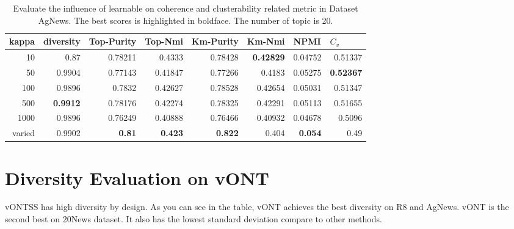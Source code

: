 \documentclass[11pt]{article}
\begin{document}
\begin{table}
\centering
\begin{tabular}{|r|r|r|r|r|r|r|r|}
\multicolumn{1}{l}{kappa} & \multicolumn{1}{l}{diversity} & \multicolumn{1}{l}{Top-Purity} & \multicolumn{1}{l}{Top-Nmi} & \multicolumn{1}{l}{Km-Purity} & \multicolumn{1}{l}{Km-Nmi} & \multicolumn{1}{l}{NPMI} & \multicolumn{1}{l}{$C_v$}  \\ 
\hline
10                        & 0.87                          & 0.78211                    & 0.4333                  & 0.78428                       & \textbf{0.42829}                    & 0.04752                  & 0.51337                 \\ 
\hline
50                        & 0.9904                        & 0.77143                    & 0.41847                 & 0.77266                       & 0.4183                     & 0.05275                  & \textbf{0.52367}                 \\ 
\hline
100                       & 0.9896                        & 0.7832                     & 0.42627                 & 0.78528                       & 0.42654                    & 0.05031                  & 0.51347                 \\ 
\hline
500                       & \textbf{0.9912}                        & 0.78176                    & 0.42274                 & 0.78325                       & 0.42291                    & 0.05113                  & 0.51655                 \\ 
\hline
1000                      & 0.9896                        & 0.76249                    & 0.40888                 & 0.76466                       & 0.40932                    & 0.04678                  & 0.5096                  \\ 
\hline
varied                    & 0.9902                        & \textbf{0.81}                       & \textbf{0.423}                   & \textbf{0.822}                         & 0.404                      & \textbf{0.054}                    & 0.49                    \\
\hline
\end{tabular}

\caption{\label{kappa} Evaluate the influence of learnable on coherence and clusterability related metric in Dataset AgNews. The best scores is highlighted in boldface. The number of topic is 20.}

\end{table}


\section{Diversity Evaluation on vONT}
\label{diveristy}
vONTSS has high diversity by design. As you can see in the table, vONT achieves the best diversity on R8 and AgNews. vONT is the second best on 20News dataset. It also has the lowest standard deviation compare to other methods.
\end{document}
